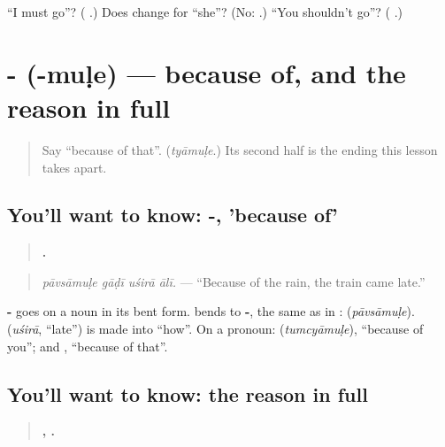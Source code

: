 \begin{tcolorbox}[breakable,colback=teal!4,colframe=teal!35!black,title={Before you move on}]
\textquotedblleft{}I must go\textquotedblright{}? (\textbf{  }.) Does \textbf{} change for \textquotedblleft{}she\textquotedblright{}? (No: \textbf{  }.) \textquotedblleft{}You shouldn't go\textquotedblright{}? (\textbf{  }.)
\end{tcolorbox}
\section[\texorpdfstring{-\mr{मुळे} (-muḷe)}{-मुळे (-muḷe)}]{- (-muḷe) — because of, and the reason in full}

\label{lesson:MR-C281-karan-mule}



\begin{quote}
Say \textquotedblleft{}because of that\textquotedblright{}. (\emph{tyāmuḷe}.) Its second half is the ending this lesson takes apart.
\end{quote}

\subsection*{You'll want to know: -, 'because of'}
\begin{quote}
\textbf{   .}
\end{quote}

\begin{quote}
\emph{pāvsāmuḷe gāḍī uśirā ālī.} — \textquotedblleft{}Because of the rain, the train came late.\textquotedblright{}
\end{quote}

\textbf{-} goes on a noun in its bent form. \textbf{} bends to \textbf{-}, the same as in \textbf{}: \textbf{} (\emph{pāvsāmuḷe}). \textbf{} (\emph{uśirā}, \textquotedblleft{}late\textquotedblright{}) is \textbf{} made into \textquotedblleft{}how\textquotedblright{}. On a pronoun: \textbf{} (\emph{tumcyāmuḷe}), \textquotedblleft{}because of you\textquotedblright{}; and \textbf{}, \textquotedblleft{}because of that\textquotedblright{}.

\subsection*{You'll want to know: the reason in full}
\begin{quote}
\textbf{   ,    .}
\end{quote}

